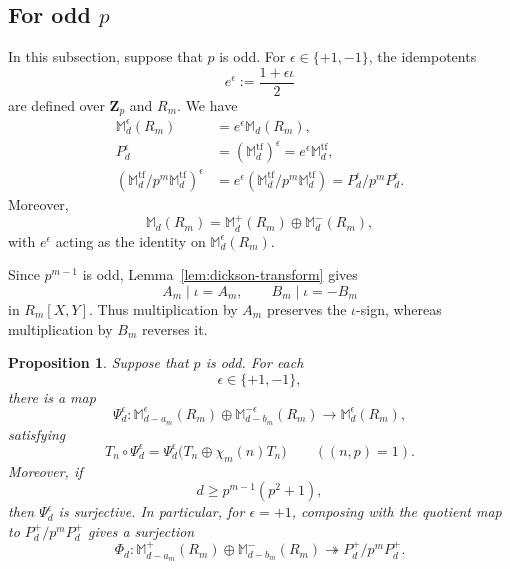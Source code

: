 \documentclass[11pt]{article}
\newcommand{\Z}{\mathbf Z}
\theoremstyle{plain}
\newtheorem{proposition}[theorem]{Proposition}
\theoremstyle{definition}
\theoremstyle{remark}
\numberwithin{equation}{section}
\begin{document}
\subsection{For odd \texorpdfstring{\(p\)}{p}}

In this subsection, suppose that \(p\) is odd. For \(\epsilon\in\{+1,-1\}\), the idempotents \[e^\epsilon:=\frac{1+\epsilon\iota}{2}\] are defined over \(\Z_p\) and \(R_m\). We have \begin{equation}\begin{aligned} \mathbb M_d^\epsilon(R_m) &=e^\epsilon\mathbb M_d(R_m),\\ P_d^\epsilon &=\left(\mathbb M_d^{\mathrm{tf}}\right)^\epsilon =e^\epsilon\mathbb M_d^{\mathrm{tf}},\\ \left( \mathbb M_d^{\mathrm{tf}}/p^m\mathbb M_d^{\mathrm{tf}} \right)^\epsilon &= e^\epsilon\left(
\mathbb M_d^{\mathrm{tf}}/p^m\mathbb M_d^{\mathrm{tf}} \right) = P_d^\epsilon/p^mP_d^\epsilon. \end{aligned} \end{equation} Moreover, \begin{equation} \mathbb M_d(R_m) = \mathbb M_d^+(R_m)\oplus\mathbb M_d^-(R_m), \label{eq:pm-decomp} \end{equation} with \(e^\epsilon\) acting as the identity on \(\mathbb M_d^\epsilon(R_m)\).

Since \(p^{m-1}\) is odd, Lemma~\ref{lem:dickson-transform} gives \begin{equation}A_m\mid\iota=A_m, \qquad B_m\mid\iota=-B_m\label{eq:am-bm-iota}\end{equation} in \(R_m[X,Y].\) Thus multiplication by \(A_m\) preserves the \(\iota\)-sign, whereas multiplication by \(B_m\) reverses it.

\begin{proposition}\label{prop:plus-transfer} Suppose that \(p\) is odd. For each \[ \epsilon\in\{+1,-1\},\] there is a map \[ \Psi_d^\epsilon: \mathbb M_{d-a_m}^ {\epsilon}(R_m) \oplus \mathbb M_{d-b_m}^{-\epsilon}(R_m) \rightarrow \mathbb M_d^{\epsilon}(R_m), \] satisfying \begin{equation} T_n\circ\Psi_d^\epsilon =  \Psi_d^\epsilon \bigl(T_n\oplus\chi_m(n)T_n\bigr) \qquad ((n,p)=1).  \label{eq:signed-manin-transfer} \end{equation} Moreover, if \[ d\geq p^{m-1}(p^2+1),\] then $\Psi^\epsilon_d$ is surjective. In particular, for \(\epsilon=+1\), composing with the quotient map to \(P^+_d/p^mP^+_d\) gives a surjection \begin{equation} \Phi_d: \mathbb M_{d-a_m}^{+}(R_m) \oplus \mathbb M_{d-b_m}^{-}(R_m) \twoheadrightarrow P_d^+/p^mP_d^+.  \label{eq:plus-target-transfer} \end{equation}
\end{proposition}
\end{document}
